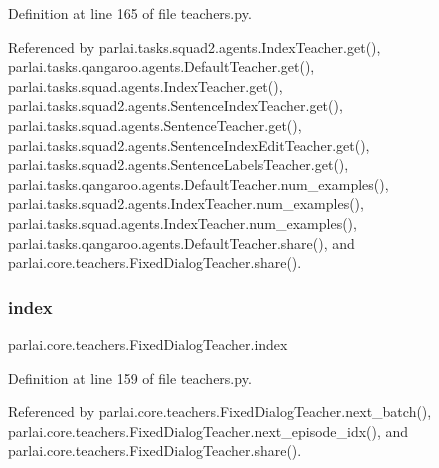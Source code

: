 Definition at line 165 of file teachers.\+py.



Referenced by parlai.\+tasks.\+squad2.\+agents.\+Index\+Teacher.\+get(), parlai.\+tasks.\+qangaroo.\+agents.\+Default\+Teacher.\+get(), parlai.\+tasks.\+squad.\+agents.\+Index\+Teacher.\+get(), parlai.\+tasks.\+squad2.\+agents.\+Sentence\+Index\+Teacher.\+get(), parlai.\+tasks.\+squad.\+agents.\+Sentence\+Teacher.\+get(), parlai.\+tasks.\+squad2.\+agents.\+Sentence\+Index\+Edit\+Teacher.\+get(), parlai.\+tasks.\+squad2.\+agents.\+Sentence\+Labels\+Teacher.\+get(), parlai.\+tasks.\+qangaroo.\+agents.\+Default\+Teacher.\+num\+\_\+examples(), parlai.\+tasks.\+squad2.\+agents.\+Index\+Teacher.\+num\+\_\+examples(), parlai.\+tasks.\+squad.\+agents.\+Index\+Teacher.\+num\+\_\+examples(), parlai.\+tasks.\+qangaroo.\+agents.\+Default\+Teacher.\+share(), and parlai.\+core.\+teachers.\+Fixed\+Dialog\+Teacher.\+share().

\mbox{\label{classparlai_1_1core_1_1teachers_1_1FixedDialogTeacher_a73ac86c06c926ab7aedd73d49e3bb2b5}} 
\subsubsection{\texorpdfstring{index}{index}}
{\footnotesize\ttfamily parlai.\+core.\+teachers.\+Fixed\+Dialog\+Teacher.\+index}



Definition at line 159 of file teachers.\+py.



Referenced by parlai.\+core.\+teachers.\+Fixed\+Dialog\+Teacher.\+next\+\_\+batch(), parlai.\+core.\+teachers.\+Fixed\+Dialog\+Teacher.\+next\+\_\+episode\+\_\+idx(), and parlai.\+core.\+teachers.\+Fixed\+Dialog\+Teacher.\+share().

\mbox{\label{classparlai_1_1core_1_1teachers_1_1FixedDialogTeacher_abf7e9a8868478220ca4df71dadeed4a9}} 
